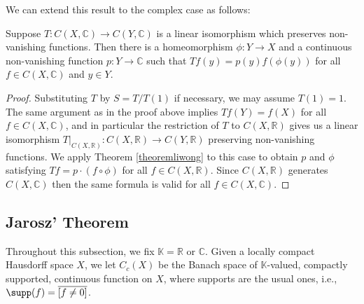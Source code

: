 We can extend this result to the complex case as follows:

\begin{corollary}\label{corollaryliwongcomplex}
Suppose $T:C(X,\mathbb{C})\to C(Y,\mathbb{C})$ is a linear isomorphism which preserves non-vanishing functions. Then there is a homeomorphism $\phi:Y\to X$ and a continuous non-vanishing function $p:Y\to\mathbb{C}$ such that $Tf(y)=p(y)f(\phi(y))$ for all $f\in C(X,\mathbb{C})$ and $y\in Y$.
\end{corollary}
\begin{proof}
Substituting $T$ by $S=T/T(1)$ if necessary, we may assume $T(1)=1$. The same argument as in the proof above implies $Tf(Y)=f(X)$ for all $f\in C(X,\mathbb{C})$, and in particular the restriction of $T$ to $C(X,\mathbb{R})$ gives us a linear isomorphism $T|_{C(X,\mathbb{R})}:C(X,\mathbb{R})\to C(Y,\mathbb{R})$ preserving non-vanishing functions. We apply Theorem \ref{theoremliwong} to this case to obtain $p$ and $\phi$ satisfying $Tf=p\cdot (f\circ\phi)$ for all $f\in C(X,\mathbb{R})$. Since $C(X,\mathbb{R})$ generates $C(X,\mathbb{C})$ then the same formula is valid for all $f\in C(X,\mathbb{C})$.\qedhere
\end{proof}

\subsection{Jarosz' Theorem}\label{subsectionjarosz}

Throughout this subsection, we fix $\mathbb{K}=\mathbb{R}$ or $\mathbb{C}$. Given a locally compact Hausdorff space $X$, we let $C_c(X)$ be the Banach space of $\mathbb{K}$-valued, compactly supported, continuous function on $X$, where supports are the usual ones, i.e., $\supp(f)=\overline{[f\neq 0]}$.




